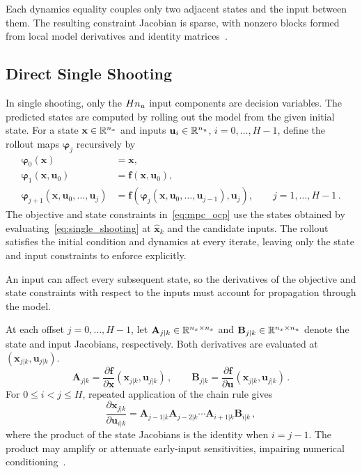 Each dynamics equality couples only two adjacent states and the input between them.
The resulting constraint Jacobian is sparse, with nonzero blocks formed from local model derivatives and identity matrices~\cite{Bock1984,Rawlings2017}.

\subsection{Direct Single Shooting}

In single shooting, only the $Hn_{u}$ input components are decision variables.
The predicted states are computed by rolling out the model from the given initial state.
For a state $\mathbf{x}\in\mathbb{R}^{n_{x}}$ and inputs $\mathbf{u}_i\in\mathbb{R}^{n_{u}}$, $i=0,\ldots,H-1$, define the rollout maps $\boldsymbol{\varphi}_j$ recursively by
%
\begin{align}
    \boldsymbol{\varphi}_0(\mathbf{x})
    &= \mathbf{x}, \nonumber \\
    \boldsymbol{\varphi}_1(\mathbf{x}, \mathbf{u}_0)
    &= \mathbf{f}(\mathbf{x}, \mathbf{u}_0), \nonumber \\
    \boldsymbol{\varphi}_{j+1}(\mathbf{x}, \mathbf{u}_0, \dots, \mathbf{u}_j)
    &= \mathbf{f}\!\left(
       \boldsymbol{\varphi}_j(\mathbf{x}, \mathbf{u}_0, \dots, \mathbf{u}_{j-1}),
       \mathbf{u}_j\right),
       \qquad j = 1, \dots, H-1 \,. \label{eq:single_shooting}
\end{align}
%
The objective and state constraints in~\eqref{eq:mpc_ocp} use the states obtained by evaluating~\eqref{eq:single_shooting} at $\hat{\mathbf{x}}_k$ and the candidate inputs.
The rollout satisfies the initial condition and dynamics at every iterate, leaving only the state and input constraints to enforce explicitly.

An input can affect every subsequent state, so the derivatives of the objective and state constraints with respect to the inputs must account for propagation through the model.

At each offset $j=0,\ldots,H-1$, let $\mathbf{A}_{j|k}\in\mathbb{R}^{n_{x}\times n_{x}}$ and $\mathbf{B}_{j|k}\in\mathbb{R}^{n_{x}\times n_{u}}$ denote the state and input Jacobians, respectively.
Both derivatives are evaluated at $(\mathbf{x}_{j|k},\mathbf{u}_{j|k})$.
%
\begin{equation*}
    \mathbf{A}_{j|k} = \frac{\partial\mathbf{f}}{\partial\mathbf{x}}(\mathbf{x}_{j|k},\mathbf{u}_{j|k})\,,
    \qquad
    \mathbf{B}_{j|k} = \frac{\partial\mathbf{f}}{\partial\mathbf{u}}(\mathbf{x}_{j|k},\mathbf{u}_{j|k})\,.
\end{equation*}
%
For $0\le i<j\le H$, repeated application of the chain rule gives
%
\begin{equation*}
    \frac{\partial \mathbf{x}_{j|k}}{\partial \mathbf{u}_{i|k}}
    = \mathbf{A}_{j-1|k}\mathbf{A}_{j-2|k}\cdots\mathbf{A}_{i+1|k}\mathbf{B}_{i|k} \,,
\end{equation*}
%
where the product of the state Jacobians is the identity when $i=j-1$.
The product may amplify or attenuate early-input sensitivities, impairing numerical conditioning~\cite{Rawlings2017}.

